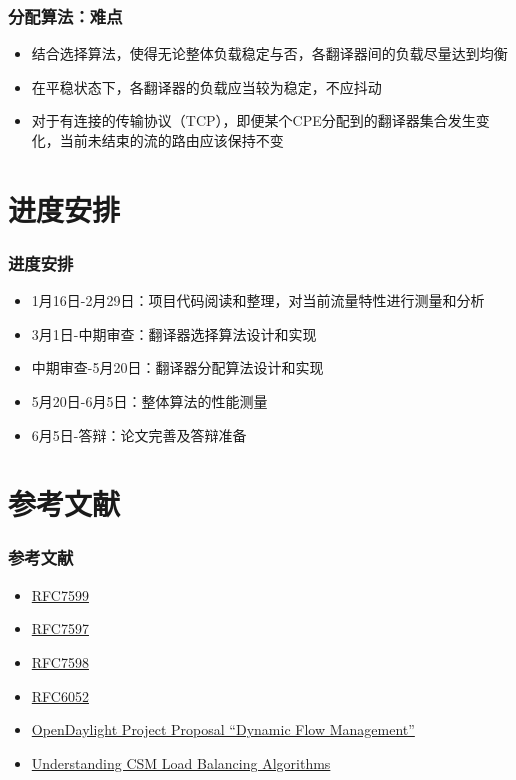 \documentclass{beamer}
\begin{document}
\begin{frame}
  \frametitle{分配算法：难点}
  \begin{itemize}
  \item 结合选择算法，使得无论整体负载稳定与否，各翻译器间的负载尽量达到均衡
  \item 在平稳状态下，各翻译器的负载应当较为稳定，不应抖动
  \item 对于有连接的传输协议（TCP），即便某个CPE分配到的翻译器集合发生变化，当前未结束的流的路由应该保持不变
  \end{itemize}
\end{frame}

\section{进度安排}

\begin{frame}
  \frametitle{进度安排}
  \begin{itemize}
  \item 1月16日-2月29日：项目代码阅读和整理，对当前流量特性进行测量和分析
  \item 3月1日-中期审查：翻译器选择算法设计和实现
  \item 中期审查-5月20日：翻译器分配算法设计和实现
  \item 5月20日-6月5日：整体算法的性能测量
  \item 6月5日-答辩：论文完善及答辩准备
  \end{itemize}
\end{frame}

\section{参考文献}
\begin{frame}
  \frametitle{参考文献}
  \begin{itemize}
  \item \href{https://tools.ietf.org/html/rfc7599}{RFC7599}
  \item \href{https://tools.ietf.org/html/rfc7597}{RFC7597}
  \item \href{https://tools.ietf.org/html/rfc7598}{RFC7598}
  \item \href{https://tools.ietf.org/html/rfc6052}{RFC6052}
  \item
    \href{https://wiki.opendaylight.org/images/4/42/OpenDaylight-lb-prj-prop-v3.pdf}{OpenDaylight Project Proposal “Dynamic Flow Management”}
  \item
    \href{http://www.cisco.com/c/en/us/support/docs/interfaces-modules/content-switching-module/28580-lb-algorithms.html}{Understanding CSM Load Balancing Algorithms}
  \end{itemize}
\end{frame}
\end{document}
